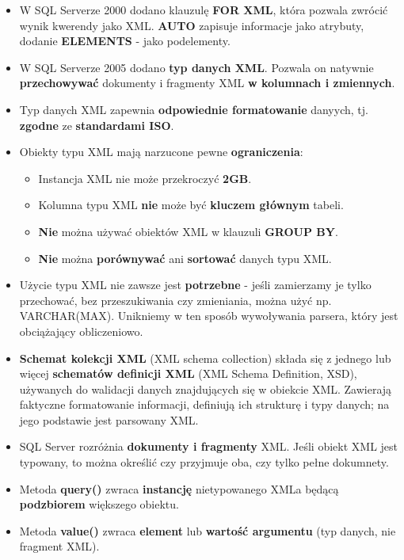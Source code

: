 \documentclass[a4paper]{article}
\begin{document}
    \begin{itemize}
        \item W SQL Serverze 2000 dodano klauzulę \textbf{FOR XML}, która pozwala zwrócić wynik kwerendy jako XML. \textbf{AUTO} zapisuje informacje jako atrybuty, dodanie \textbf{ELEMENTS} - jako podelementy.
        \item W SQL Serverze 2005 dodano \textbf{typ danych XML}. Pozwala on natywnie \textbf{przechowywać} dokumenty i fragmenty XML \textbf{w kolumnach i zmiennych}.
        \item Typ danych XML zapewnia \textbf{odpowiednie formatowanie} danyych, tj. \textbf{zgodne} ze \textbf{standardami ISO}.
        \item Obiekty typu XML mają narzucone pewne \textbf{ograniczenia}:
        \begin{itemize}
            \item Instancja XML nie może przekroczyć \textbf{2GB}.
            \item Kolumna typu XML \textbf{nie} może być \textbf{kluczem głównym} tabeli.
            \item \textbf{Nie} można używać obiektów XML w klauzuli \textbf{GROUP BY}.
            \item \textbf{Nie} można \textbf{porównywać} ani \textbf{sortować} danych typu XML.
        \end{itemize}
        \item Użycie typu XML nie zawsze jest \textbf{potrzebne} - jeśli zamierzamy je tylko przechować, bez przeszukiwania czy zmieniania, można użyć np. VARCHAR(MAX). Unikniemy w ten sposób wywoływania parsera, który jest obciążający obliczeniowo.
        \item \textbf{Schemat kolekcji XML} (XML schema collection) składa się z jednego lub więcej \textbf{schematów definicji XML} (XML Schema Definition, XSD), używanych do walidacji danych znajdujących się w obiekcie XML. Zawierają faktyczne formatowanie informacji, definiują ich strukturę i typy danych; na jego podstawie jest parsowany XML.
        \item SQL Server rozróżnia \textbf{dokumenty i fragmenty} XML. Jeśli obiekt XML jest typowany, to można określić czy przyjmuje oba, czy tylko pełne dokumnety.
        \item Metoda \textbf{query()} zwraca \textbf{instancję} nietypowanego XMLa będącą \textbf{podzbiorem} większego obiektu.
        \item Metoda \textbf{value()} zwraca \textbf{element} lub \textbf{wartość argumentu} (typ danych, nie fragment XML).

\end{itemize}
\end{document}
